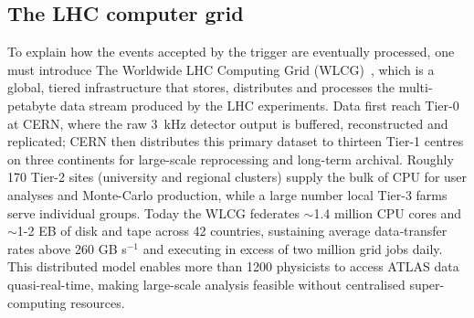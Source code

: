 \subsection{The LHC computer grid}
\label{sec:computer_grid}
To explain how the events accepted by the trigger are eventually processed, one must introduce The Worldwide LHC Computing Grid (WLCG)~\cite{Bird:1695401}, which is a global, tiered infrastructure that stores, distributes and processes the multi-petabyte data stream produced by the LHC experiments.  Data first reach Tier-0 at CERN, where the raw 3~kHz detector output is buffered, reconstructed and replicated; CERN then distributes this primary dataset to thirteen Tier-1 centres on three continents for large-scale reprocessing and long-term archival. Roughly 170 Tier-2 sites (university and regional clusters) supply the bulk of CPU for user analyses and Monte-Carlo production, while a large number local Tier-3 farms serve individual groups.  
Today the WLCG federates $\sim$1.4 million CPU cores and $\sim$1-2 EB of disk and tape across 42 countries, sustaining average data‐transfer rates above 260 GB s$^{-1}$ and executing in excess of two million grid jobs daily.  This distributed model enables more than 1200 physicists to access ATLAS data quasi-real-time, making large-scale analysis feasible without centralised super-computing resources.
